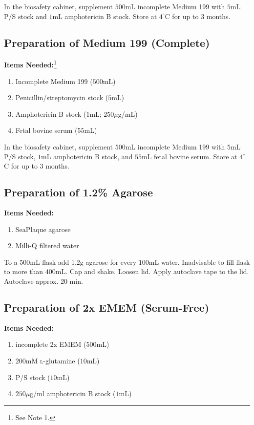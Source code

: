 In the biosafety cabinet, supplement $500$mL incomplete Medium 199 with $5$mL P/S stock and $1$mL amphotericin B stock. Store at $4^{\circ}$C for up to 3 months.

\subsection{Preparation of Medium 199 (Complete)}

{\bfseries Items Needed:}\footnote{See Note 1.} \begin{enumerate}
	\item Incomplete Medium 199 ($500$mL)
	\item Penicillin/streptomycin stock ($5$mL)
	\item Amphotericin B stock ($1$mL; $250\mu$g/mL)
	\item Fetal bovine serum ($55$mL)
\end{enumerate}

In the biosafety cabinet, supplement $500$mL incomplete Medium 199 with $5$mL P/S stock, $1$mL amphotericin B stock, and $55$mL fetal bovine serum. Store at $4^{\circ}$C for up to 3 months.

\subsection{Preparation of 1.2\% Agarose}

{\bfseries Items Needed:} \begin{enumerate}
	\item SeaPlaque agarose
	\item Milli-Q filtered water
\end{enumerate}

To a $500$mL flask add $1.2$g agarose for every $100$mL water. Inadvisable to fill flask to more than $400$mL. Cap and shake. Loosen lid. Apply autoclave tape to the lid. Autoclave approx. 20 min.

\subsection{Preparation of 2x EMEM (Serum-Free)}

{\bfseries Items Needed:} \begin{enumerate}
	\item incomplete 2x EMEM ($500$mL)
	\item $200$mM \textsc{l}-glutamine ($10$mL)
	\item P/S stock ($10$mL)
	\item $250\mu$g/ml amphotericin B stock ($1$mL)
\end{enumerate}

